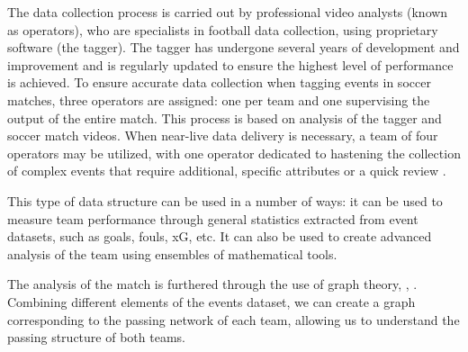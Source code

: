 \documentclass[
  twoside,nohyper]{book}
\begin{document}
The data collection process is carried out by professional video
analysts (known as operators), who are specialists in football data
collection, using proprietary software (the tagger). The tagger has
undergone several years of development and improvement and is regularly
updated to ensure the highest level of performance is achieved. To
ensure accurate data collection when tagging events in soccer matches,
three operators are assigned: one per team and one supervising the
output of the entire match. This process is based on analysis of the
tagger and soccer match videos. When near-live data delivery is
necessary, a team of four operators may be utilized, with one operator
dedicated to hastening the collection of complex events that require
additional, specific attributes or a quick review \citep{3}.

\begin{table}[!h]
\centering
\caption{\label{tab:event}Example of an events dataset of a game.}
\centering
{}
\end{table}

This type of data structure can be used in a number of ways: it can be
used to measure team performance through general statistics extracted
from event datasets, such as goals, fouls, xG, etc. It can also be used
to create advanced analysis of the team using ensembles of mathematical
tools.

The analysis of the match is furthered through the use of graph theory,
\citep{Buldu}, \citep{NOVILLO2024114355}. Combining
different elements of the events dataset, we can create a graph
corresponding to the passing network of each team, allowing us to
understand the passing structure of both teams.
\end{document}
